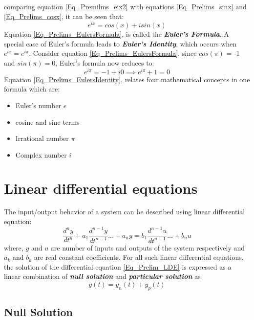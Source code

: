 comparing equation \eqref{Eq_Premilms_eix2} with equations \eqref{Eq_Prelims_sinx} and \eqref{Eq_Prelims_cosx}, it can be seen that:
\begin{equation} \label{Eq_Prelims_EulersFormula}
	e^{ix} = cos(x) + i sin(x)
\end{equation}
Equation \eqref{Eq_Prelims_EulersFormula}, is called the \textbf{\textit{Euler's Formula}}. A special case of Euler's formula leads to \textbf{\textit{Euler's Identity}}, which occurs when $e^{ix} = e^{i\pi}$. Consider equation \eqref{Eq_Prelims_EulersFormula}, since $cos(\pi)$ = -1 and $sin(\pi) = 0$, Euler's formula now reduces to:
\begin{equation} \label{Eq_Prelims_EulersIdentity}
	e^{i\pi} = -1 + i 0 \implies e^{i\pi} + 1 = 0
\end{equation}
Equation \eqref{Eq_Prelims_EulersIdentity}, relates four mathematical concepts in one formula which are:
\begin{itemize}
	\item Euler's number $e$
	\item cosine and sine terms
	\item Irrational number $\pi$
	\item Complex number $i$
\end{itemize}

\section{Linear differential equations} \label{Sec_Prelim_LDE}

The input/output behavior of a system can be described using linear differential equation:
\begin{equation} \label{Eq_Prelim_LDE}
	\frac{d^{n}y}{dt^{n}} + a_1 \frac{d^{n-1}y}{dt^{n-1}} ... + a_n y = b_1 \frac{d^{n-1}u}{dt^{n-1}} ... + b_n u
\end{equation}
where, $y$ and $u$ are number of inputs and outputs of the system respectively and $a_k$ and $b_k$ are real constant coefficients. For all such linear differential equations, the solution of the differential equation \eqref{Eq_Prelim_LDE} is expressed as a linear combination of \textbf{\textit{null solution}} and \textbf{\textit{particular solution}} as
\begin{equation}
	y(t) = y_{n}(t) + y_{p}(t)
\end{equation}

\subsection{Null Solution}

